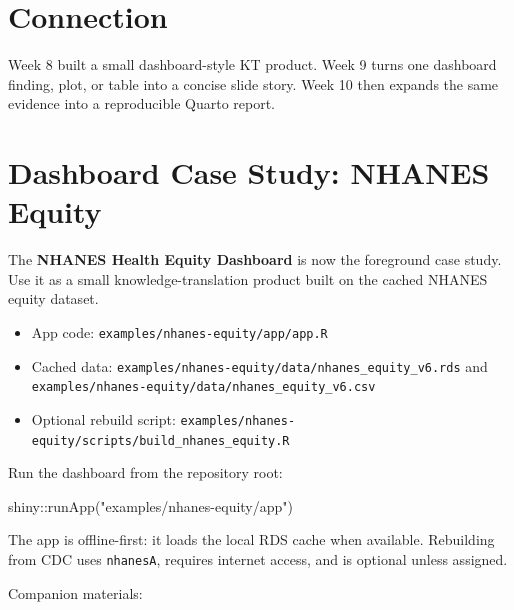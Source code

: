 \documentclass[
  letterpaper,
  DIV=11,
  numbers=noendperiod,
  oneside]{scrreprt}
\newenvironment{Shaded}{\begin{snugshade}}{\end{snugshade}}
\newcommand{\FunctionTok}[1]{\textcolor[rgb]{0.28,0.35,0.67}{#1}}
\newcommand{\NormalTok}[1]{\textcolor[rgb]{0.00,0.23,0.31}{#1}}
\newcommand{\SpecialCharTok}[1]{\textcolor[rgb]{0.37,0.37,0.37}{#1}}
\newcommand{\StringTok}[1]{\textcolor[rgb]{0.13,0.47,0.30}{#1}}
\providecommand{\tightlist}{%
  \setlength{\itemsep}{0pt}\setlength{\parskip}{0pt}}
\begin{document}
\section*{Connection}\label{connection-8}


Week 8 built a small dashboard-style KT product. Week 9 turns one
dashboard finding, plot, or table into a concise slide story. Week 10
then expands the same evidence into a reproducible Quarto report.

\section*{Dashboard Case Study: NHANES
Equity}\label{dashboard-case-study-nhanes-equity-1}


The \textbf{NHANES Health Equity Dashboard} is now the foreground case
study. Use it as a small knowledge-translation product built on the
cached NHANES equity dataset.

\begin{itemize}
\tightlist
\item
  App code: \texttt{examples/nhanes-equity/app/app.R}
\item
  Cached data:
  \texttt{examples/nhanes-equity/data/nhanes\_equity\_v6.rds} and
  \texttt{examples/nhanes-equity/data/nhanes\_equity\_v6.csv}
\item
  Optional rebuild script:
  \texttt{examples/nhanes-equity/scripts/build\_nhanes\_equity.R}
\end{itemize}

Run the dashboard from the repository root:

\begin{Shaded}
\begin{Highlighting}[numbers=left,,]
\NormalTok{shiny}\SpecialCharTok{::}\FunctionTok{runApp}\NormalTok{(}\StringTok{"examples/nhanes{-}equity/app"}\NormalTok{)}
\end{Highlighting}
\end{Shaded}

The app is offline-first: it loads the local RDS cache when available.
Rebuilding from CDC uses \texttt{nhanesA}, requires internet access, and
is optional unless assigned.

Companion materials:
\end{document}
